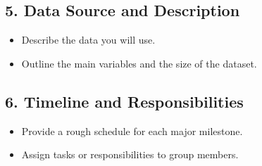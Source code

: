 \documentclass[12pt]{article}
\begin{document}
\subsection*{5. Data Source and Description}
\begin{itemize}
    \item Describe the data you will use.
    \item Outline the main variables and the size of the dataset.
\end{itemize}

\subsection*{6. Timeline and Responsibilities}
\begin{itemize}
    \item Provide a rough schedule for each major milestone.
    \item Assign tasks or responsibilities to group members.
\end{itemize}
\end{document}
